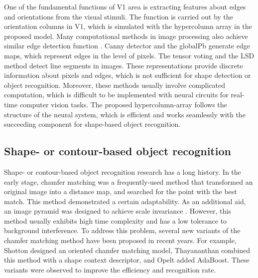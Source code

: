 \documentclass[journal]{IEEEtran}
\begin{document}
One of the fundamental functions of V1 area is extracting features about edges and orientations from the visual stimuli.
The function is carried out by the orientation columns in V1, 
which is simulated with the hypercolumn array in the proposed model. 
Many computational methods in image processing also achieve similar edge detection function
\cite{canny1986,arbelaez2011,moreno2014}.
Canny detector \cite{canny1986} and the globalPb \cite{arbelaez2011} generate edge maps,
which represent edges in the level of pixels. 
The tensor voting \cite{moreno2014} and the LSD method \cite{von2008} detect line segments in images. 
These representations provide discrete information about pixels and edges, 
which is not sufficient for shape detection or object recognition. 
Moreover, these methods usually involve complicated computation, 
which is difficult to be implemented with neural circuits for real-time computer vision tasks. 
The proposed hypercolumn-array follows the structure of the neural system, 
which is efficient and works seamlessly with the succeeding component for shape-based object recognition.

\subsection{Shape- or contour-based object recognition}

Shape- or contour-based object recognition research has a long history. 
In the early stage, chamfer matching \cite{borgefors1988,shotton2005,thayananthan2003,opelt2006} 
was a frequently-used method that transformed an original image into a distance map, 
and searched for the point with the best match. 
This method demonstrated a certain adaptability. 
As an additional aid, an image pyramid was designed to achieve scale invariance \cite{borgefors1988}. 
However, this method usually exhibits high time complexity and has a low tolerance to background interference. 
To address this problem, several new variants of the chamfer matching method have been proposed in recent years. 
For example, Shotton \cite{shotton2005} designed an oriented chamfer matching model, 
Thayananthan \cite{thayananthan2003} combined this method with a shape context descriptor, 
and Opelt \cite{thayananthan2003} added AdaBoost. 
These variants were observed to improve the efficiency and recognition rate.
\end{document}
